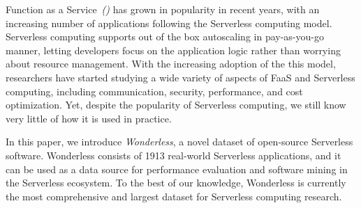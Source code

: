 
Function as a Service~\emph{(\faas)} has grown in popularity in recent years, 
with an increasing number of applications following the Serverless computing model. 
Serverless computing supports out of the box autoscaling in pay-as-you-go manner, 
letting developers focus on the application logic rather than worrying 
about resource management. 
%
With the increasing adoption of the this model, researchers have started 
studying a wide variety of aspects of FaaS and Serverless computing, 
including communication, security, performance, and cost optimization. 
Yet, despite the popularity of Serverless computing, we still know very little of how it 
is used in practice.

In this paper, we introduce \emph{Wonderless}, a novel dataset
of open-source Serverless software. 
Wonderless consists of 1913 real-world Serverless applications, 
and it can be used as a data source for performance evaluation and 
software mining in the Serverless ecosystem. To the best of our knowledge, 
Wonderless is currently the most comprehensive and largest dataset
for Serverless computing research.


